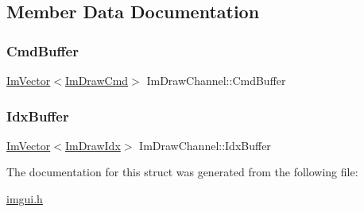 \subsection{Member Data Documentation}
\mbox{\label{struct_im_draw_channel_abdaa17053d55fb6757c1971d410ceddf}} 
\subsubsection{\texorpdfstring{Cmd\+Buffer}{CmdBuffer}}
{\footnotesize\ttfamily \mbox{\hyperlink{class_im_vector}{Im\+Vector}}$<$\mbox{\hyperlink{struct_im_draw_cmd}{Im\+Draw\+Cmd}}$>$ Im\+Draw\+Channel\+::\+Cmd\+Buffer}

\mbox{\label{struct_im_draw_channel_a7fbed7d3523124fadd94859d5ac0fd67}} 
\subsubsection{\texorpdfstring{Idx\+Buffer}{IdxBuffer}}
{\footnotesize\ttfamily \mbox{\hyperlink{class_im_vector}{Im\+Vector}}$<$\mbox{\hyperlink{imgui_8h_afdc8744a5ac1a968b1ddfa47e13b2fa1}{Im\+Draw\+Idx}}$>$ Im\+Draw\+Channel\+::\+Idx\+Buffer}



The documentation for this struct was generated from the following file\+:\begin{DoxyCompactItemize}
\item 
\mbox{\hyperlink{imgui_8h}{imgui.\+h}}\end{DoxyCompactItemize}
